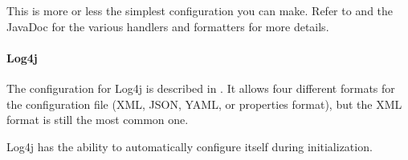 This is more or less the simplest configuration you can make. Refer to \autocite{ORACLE_DOC_LOGGING_OVERVIEW, ORACLE_DOC_LOGGING_PACKAGE, ORACLE_DOC_LOGMANAGER_CLASS} and the JavaDoc for the various handlers and formatters for more details.


\paragraph{Log4j} The configuration for Log4j is described in \autocite{APACHE_LOG4J:Configuration}. It allows four different formats for the configuration file (XML, JSON, YAML, or properties format), but the XML format is still the most common one.

Log4j has the ability to automatically configure itself during initialization. 
